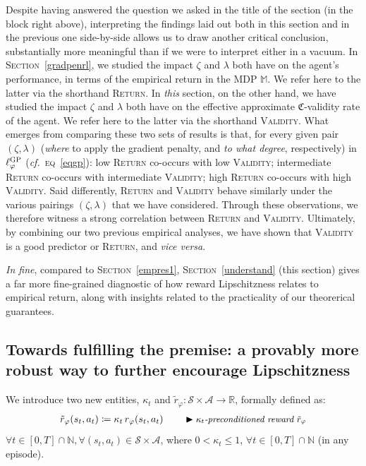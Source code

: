 Despite having answered the question we asked in the title of the section (in the block right above),
interpreting the findings laid out both in this section and in the previous one side-by-side
allows us to draw another critical conclusion, substantially more meaningful than
if we were to interpret either in a vacuum.
In \textsc{Section}~\ref{gradpenrl}, we studied the impact $\zeta$ and $\lambda$
both have on the agent's performance, in terms of the empirical return in the MDP $\mathbb{M}$.
We refer here to the latter via the shorthand \textsc{Return}.
In \emph{this} section, on the other hand, we have studied the impact $\zeta$ and $\lambda$
both have on the effective approximate $\mathfrak{C}$-validity rate of the agent.
We refer here to the latter via the shorthand \textsc{Validity}.
What emerges from comparing these two sets of results is that, for every given pair $(\zeta,\lambda)$
(\emph{where} to apply the gradient penalty, and \emph{to what degree}, respectively)
in $\ell_\varphi^\textsc{GP}$ (\textit{cf.}~\textsc{eq}~\ref{eqgp}):
low \textsc{Return} co-occurs with low \textsc{Validity};
intermediate \textsc{Return} co-occurs with intermediate \textsc{Validity};
high \textsc{Return} co-occurs with high \textsc{Validity}.
Said differently, \textsc{Return} and \textsc{Validity} behave similarly under the various
pairings $(\zeta,\lambda)$ that we have considered.
Through these observations, we therefore witness a strong correlation between
\textsc{Return} and \textsc{Validity}.
Ultimately, by combining our two previous empirical analyses,
we have shown that \textsc{Validity} is a good predictor or \textsc{Return},
and \textit{vice versa}.

\textit{In fine}, compared to \textsc{Section}~\ref{empres1}, \textsc{Section}~\ref{understand} (this section)
gives a far more fine-grained diagnostic of how reward Lipschitzness relates to empirical return,
along with insights related to the practicality of our theorerical guarantees.

\subsection[%
A provably more robust way to further encourage Lipschitzness]{%
Towards fulfilling the premise: a provably more robust way to further encourage Lipschitzness}
\label{purpleandres}

We introduce two new entities, $\kappa_t$
and $\tilde{r}_\varphi : \mathcal{S} \times \mathcal{A} \to \mathbb{R}$, formally defined as:
\begin{align}
\tilde{r}_\varphi (s_t,a_t)
\coloneqq \kappa_t \, r_\varphi (s_t,a_t)
\qquad
\blacktriangleright\text{\small{\textit{$\kappa_t$-preconditioned reward $\tilde{r}_\varphi$}}}
\label{precondrew}
\end{align}
$\forall t \in [0, T] \cap \mathbb{N},
\forall (s_t, a_t) \in \mathcal{S} \times \mathcal{A}$,
where $0 < \kappa_t \leq 1$, $\forall t \in [0, T] \cap \mathbb{N}$ (in any episode).

